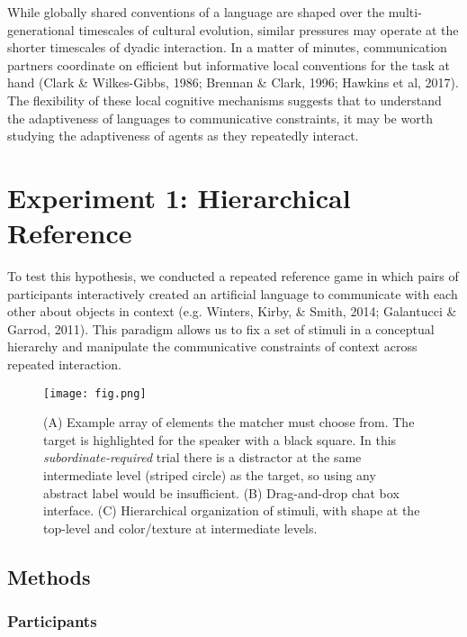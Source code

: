 \documentclass[10pt,letterpaper]{article}
\begin{document}
While globally shared conventions of a language are shaped over the multi-generational timescales of cultural evolution, similar pressures may operate at the shorter timescales of dyadic interaction. In a matter of minutes, communication partners coordinate on efficient but informative local conventions for the task at hand (Clark \& Wilkes-Gibbs, 1986; Brennan \& Clark, 1996; Hawkins et al, 2017). The flexibility of these local cognitive mechanisms suggests that to understand the adaptiveness of languages to communicative constraints, it may be worth studying the adaptiveness of agents as they repeatedly interact. 
		 	
\section{Experiment 1: Hierarchical Reference}

To test this hypothesis, we conducted a repeated reference game in which pairs of participants interactively created an artificial language to communicate with each other about objects in context (e.g. Winters, Kirby, \& Smith, 2014; Galantucci \& Garrod, 2011). This paradigm allows us to fix a set of stimuli in a conceptual hierarchy and manipulate the communicative constraints of context across repeated interaction.

\begin{figure*}[t]
\begin{center}
{\texttt{[image: fig.png]}}
{\caption{{\footnotesize (A) Example array of elements the matcher must choose from. The target is highlighted for the speaker with a black square. In this \emph{subordinate-required} trial there is a distractor at the same intermediate level (striped circle) as the target, so using any abstract label would be insufficient. (B) Drag-and-drop chat box interface. (C) Hierarchical organization of stimuli, with shape at the top-level and color/texture at intermediate levels.  \label{exp}}}}
\end{center}
\end{figure*}

\subsection{Methods}

\subsubsection{Participants}
\end{document}
